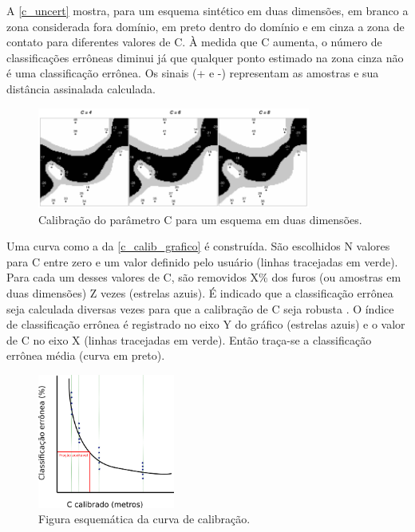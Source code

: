 A \autoref{c_uncert} mostra, para um esquema sintético em duas dimensões, em branco a zona considerada fora domínio, em preto dentro do domínio e em cinza a zona de contato para diferentes valores de C. À medida que C aumenta, o número de classificações errôneas diminui já que qualquer ponto estimado na zona cinza não é uma classificação errônea. Os sinais (+ e -) representam as amostras e sua distância assinalada calculada.

\begin{figure}[H]
	\caption{\label{c_uncert}Calibração do parâmetro C para um esquema em duas dimensões.}
	\centering
		\includegraphics[width=0.8\textwidth]{capitulo_2/imagens/c_uncert.png}
\end{figure}

Uma curva como a da \autoref{c_calib_grafico} é construída. São escolhidos N valores para C entre zero e um valor definido pelo usuário (linhas tracejadas em verde). Para cada um desses valores de C, são removidos X\% dos furos (ou amostras em duas dimensões) Z vezes (estrelas azuis). É indicado que a classificação errônea seja calculada diversas vezes para que a calibração de C seja robusta \cite{wilde2012kriging}. O índice de classificação errônea é registrado no eixo Y do gráfico (estrelas azuis) e o valor de C no eixo X (linhas tracejadas em verde). Então traça-se a classificação errônea média (curva em preto).

\begin{figure}[H]
	\caption{\label{c_calib_grafico}Figura esquemática da curva de calibração.}
	\centering
		\includegraphics[width=0.4\textwidth]{capitulo_2/imagens/calibration.png}
\end{figure}

